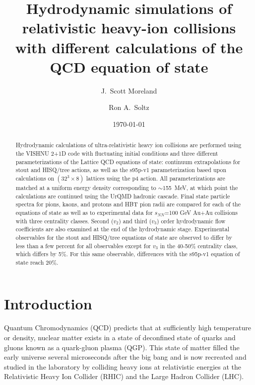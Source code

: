 \documentclass[aps,prc,reprint,amsmath,nofootinbib,superscriptaddress]{revtex4-1}
\begin{document}
\title{Hydrodynamic simulations of relativistic heavy-ion collisions\\ with different calculations of the QCD equation of state}

\author{J.\ Scott Moreland}
\author{Ron A.\ Soltz}

\date{\today}

\begin{abstract}
Hydrodynamic calculations of ultra-relativistic heavy ion collisions are performed using the VISHNU 2+1D code with fluctuating initial conditions and three different parameterizations of the Lattice QCD equations of state: continuum extrapolations for stout and HISQ/tree actions, as well as the s95p-v1 parameterization based upon calculations on $(32^3 \times 8)$ lattices using the p4 action.  All parameterizations are matched at a uniform energy density corresponding to $\sim$155~MeV, at which point the calculations are continued using the UrQMD hadronic cascade.  Final state particle spectra for pions, kaons, and protons and HBT pion radii are compared for each of the equations of state as well as to experimental data for $s_{NN}$=100 GeV Au+Au collisions with three centrality classes.  Second ($v_2$) and third ($v_3$) order hydrodynamic flow coefficients are also examined at the end of the hydrodynamic stage.  Experimental observables for the stout and HISQ/tree equations of state are observed to differ by less than a few percent for all observables except for $v_3$ in the 40-50\% centrality class, which differs by 5\%.  For this same observable, differences with the s95p-v1 equation of state reach 20\%.
\end{abstract}

\maketitle

\section{Introduction}

Quantum Chromodynamics (QCD) predicts that at sufficiently high temperature or density, nuclear matter exists in a state of deconfined state of quarks and gluons known as a quark-gluon plasma (QGP). 
This state of matter filled the early universe several microseconds after the big bang and is now recreated and studied in the laboratory by colliding heavy ions at relativistic energies at the Relativistic Heavy Ion Collider (RHIC) and the Large Hadron Collider (LHC).
\end{document}
